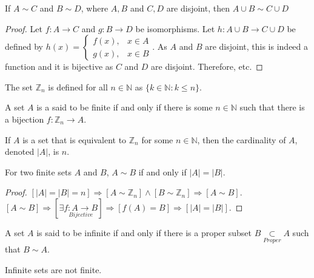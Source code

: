             \begin{theorem}
            If $A\sim C$ and $B\sim D$, where $A,B$ and $C,D$ are disjoint, then $A\cup B \sim C\cup D$
            \end{theorem}
            \begin{proof}
            Let $f:A\rightarrow C$ and $g:B\rightarrow D$ be isomorphisms. Let $h:A\cup B \rightarrow C\cup D$ be defined by $h(x) = \begin{cases} f(x), & x\in A\\ g(x), & x\in B\end{cases}$. As $A$ and $B$ are disjoint, this is indeed a function and it is bijective as $C$ and $D$ are disjoint. Therefore, etc.
            \end{proof}
            \begin{definition}
            The set $\mathbb{Z}_n$ is defined for all $n\in \mathbb{N}$ as $\{k\in \mathbb{N}: k\leq n\}$.
            \end{definition}
            \begin{definition}
            A set $A$ is a said to be finite if and only if there is some $n\in \mathbb{N}$ such that there is a bijection $f:\mathbb{Z}_n \rightarrow A$.
            \end{definition}
            \begin{definition}
            If $A$ is a set that is equivalent to $\mathbb{Z}_n$ for some $n\in \mathbb{N}$, then the cardinality of $A$, denoted $|A|$, is $n$.
            \end{definition}
            \begin{theorem}
            For two finite sets $A$ and $B$, $A\sim B$ if and only if $|A|=|B|$.
            \end{theorem}
            \begin{proof}
            $[|A|=|B|=n]\Rightarrow[A\sim \mathbb{Z}_n]\land[B\sim \mathbb{Z}_n]\Rightarrow [A\sim B]$. $[A\sim B]\Rightarrow [\exists \underset{Bijective}{f:A\rightarrow B}]\Rightarrow [f(A) = B]\Rightarrow [|A|=|B|]$.
            \end{proof}
            \begin{definition}
            A set $A$ is said to be infinite if and only if there is a proper subset $B\underset{Proper}\subset A$ such that $B\sim A$.
            \end{definition}
            \begin{theorem}
            Infinite sets are not finite.
            \end{theorem}
